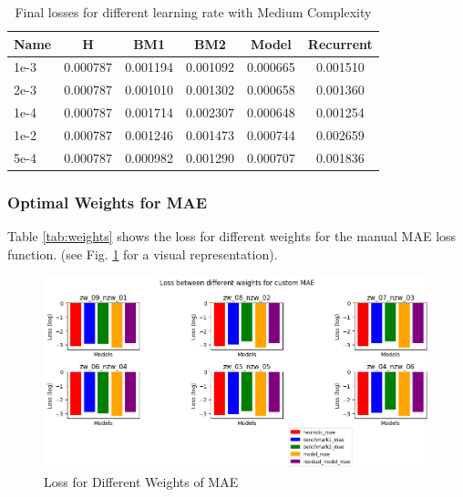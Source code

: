 \begin{table}[htbp]
	\centering
	\caption{Final losses for different learning rate with Medium Complexity}
	\label{tab:lr}
	\begin{tabular}{p{2cm}ccccc}
		\toprule
		Name &  H &  BM1 &  BM2 &  Model &  Recurrent \\
		\midrule
		1e-3 &       0.000787 &        0.001194 &        0.001092 &   0.000665 &            0.001510 \\
		2e-3 &       0.000787 &        0.001010 &        0.001302 &   0.000658 &            0.001360 \\
		1e-4 &       0.000787 &        0.001714 &        0.002307 &   0.000648 &            0.001254 \\
		1e-2 &       0.000787 &        0.001246 &        0.001473 &   0.000744 &            0.002659 \\
		5e-4 &       0.000787 &        0.000982 &        0.001290 &   0.000707 &            0.001836 \\
		\bottomrule
	\end{tabular}
\end{table}

\subsubsection*{Optimal Weights for MAE}
Table \ref{tab:weights} shows the loss for different weights for the manual MAE loss function. (see Fig. \ref{fig:MAE-weights-init} for a visual representation). 
\begin{figure}[tbph]
	\centering
	\includegraphics[width=0.9\linewidth, height=0.5\textheight]{Figures/Results/Shuffle_Weights/weights/weights}
	\caption[Loss for Different Weights of MAE]{Loss for Different Weights of MAE}
	\label{fig:MAE-weights-init}
\end{figure}

